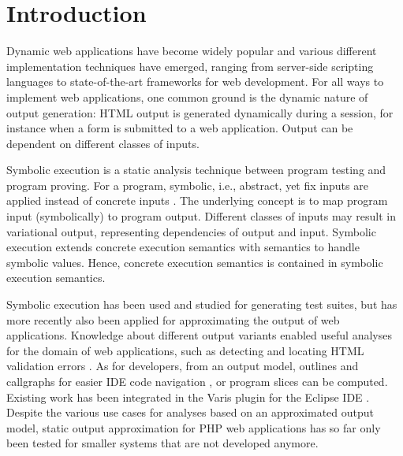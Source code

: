 \documentclass{sig-alternate-05-2015}
\begin{document}



%
%
\printccsdesc



\section{Introduction}
Dynamic web applications have become widely popular and various different implementation techniques have emerged, ranging from server-side scripting languages to state-of-the-art frameworks for web development. For all  ways to implement web applications, one common ground is the dynamic nature of output generation: HTML output is generated dynamically during a session, for instance when a form is submitted to a web application. Output can be dependent on different classes of inputs.

Symbolic execution is a static analysis technique between program testing and program proving. For a program, symbolic, i.e., abstract, yet fix inputs are applied instead of  concrete inputs \cite{Darringer1978,King1976}. The underlying concept is to map program input (symbolically) to program output.  Different classes of inputs may result in variational output, representing  dependencies of output and input. Symbolic execution extends concrete execution semantics with semantics to handle symbolic values. Hence, concrete execution semantics is contained in symbolic execution semantics. 

Symbolic execution has been used and studied for generating test suites, but has more recently also been applied for approximating the output of web applications. Knowledge about different output variants enabled useful analyses for the domain of web applications, such as detecting and locating HTML validation errors \cite{Nguyen:2011:AFH:2190078.2190142}. As for developers, from an output model, outlines and callgraphs for easier IDE code navigation \cite{Nguyen:2014:BCG:2635868.2635928}, or program slices \cite{Nguyen:2015:CPS:2786805.2786872} can be computed. Existing work has been integrated in the Varis plugin for the Eclipse IDE \cite{Nguyen:2015:VIS:2819009.2819140}. Despite the various use cases for analyses based on an approximated output model, static output approximation for PHP web applications has so far only been tested for smaller systems that are not developed anymore.
\end{document}
